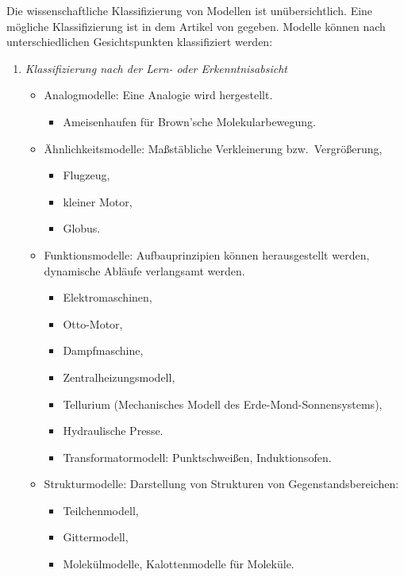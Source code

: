 \mip
Die wissenschaftliche Klassifizierung von Modellen ist un\"{u}bersichtlich. Eine mögliche Klassifizierung ist in dem Artikel von \textcite{MichelskisSeifertThieleWünscher} gegeben. Modelle k\"{o}nnen nach unterschiedlichen Gesichtspunkten klassifiziert werden:

\begin{enumerate}
\item{\it{Klassifizierung nach der Lern- oder Erkenntnisabsicht}}
\begin{itemize}
\item
Analogmodelle: Eine Analogie wird hergestellt.
\begin{itemize}
\item Ameisenhaufen f\"{u}r Brown'sche Molekularbewegung.
\end{itemize}

\item
\"{A}hnlichkeitsmodelle: Ma{\ss}st\"{a}bliche Verkleinerung bzw.\ Vergr\"{o}{\ss}erung,
\begin{itemize}
\item Flugzeug,
\item kleiner Motor,
\item Globus.
\end{itemize}

\item
Funktionsmodelle:  Aufbauprinzipien k\"{o}nnen herausgestellt
werden, dynamische Abl\"{a}ufe verlangsamt werden.
\begin{itemize}
\item Elektromaschinen,
\item Otto-Motor,
\item Dampfmaschine,
\item Zentralheizungsmodell,
\item Tellurium (Mechanisches Modell des Erde-Mond-Sonnensystems),
\item Hydraulische Presse.
\item Transformatormodell: Punktschwei{\ss}en, Induktionsofen.
\end{itemize}

\item
Strukturmodelle:
Darstellung von Strukturen von Gegenstandsbereichen:
\begin{itemize}
\item Teilchenmodell,
\item Gittermodell,
\item Molek\"{u}lmodelle, Kalottenmodelle f\"{u}r Molek\"{u}le.
\end{itemize}


\end{itemize}
\end{enumerate}
